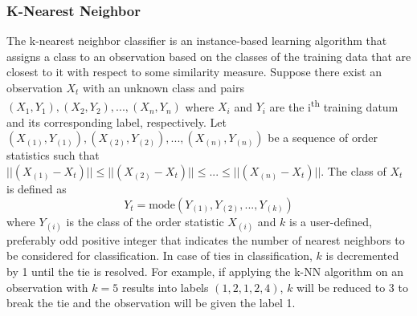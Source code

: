 \documentclass[conference,compsoc]{IEEEtran}
\begin{document}
\subsubsection{K-Nearest Neighbor}
The k-nearest neighbor classifier \cite{altman92} is an instance-based learning algorithm that assigns a class to an observation based on the classes of the training data that are closest to it with respect to some similarity measure. Suppose there exist an observation $X_t$ with an unknown class and pairs $(X_1,Y_1),(X_2,Y_2),...,(X_n,Y_n)$ where $X_i$ and $Y_i$ are the i\textsuperscript{th} training datum and its corresponding label, respectively. Let $(X_{(1)},Y_{(1)}),(X_{(2)},Y_{(2)}),...,(X_{(n)},Y_{(n)})$ be a sequence of order statistics such that  $\lvert\lvert (X_{(1)}-X_t) \rvert\rvert \leq \lvert\lvert (X_{(2)}-X_t) \rvert\rvert \leq ... \leq \lvert\lvert (X_{(n)}-X_t) \rvert\rvert$. The class of $X_t$ is defined as
\[ Y_t = \text{mode}(Y_{(1)},Y_{(2)},...,Y_{(k)})\]
where $Y_{(i)}$ is the class of the order statistic $X_{(i)}$ and $k$ is a user-defined, preferably odd positive integer that indicates the number of nearest neighbors to be considered for classification. In case of ties in classification, $k$ is decremented by 1 until the tie is resolved. For example, if applying the k-NN algorithm on an observation with $k = 5$ results into labels $(1,2,1,2,4)$, $k$ will be reduced to 3 to break the tie and the observation will be given the label 1. 
\end{document}
